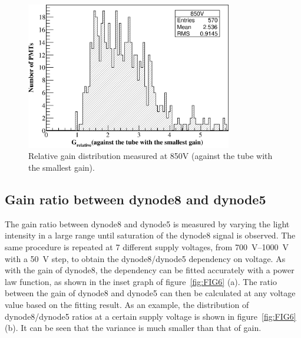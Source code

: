 \documentclass{JINST}
\begin{document}
\begin{figure}[tbp]
	\centering
	\includegraphics[width=90mm]{FIG5}
	\caption{Relative gain distribution measured at 850V (against the tube with the smallest gain).}
	\label{fig:FIG5}
\end{figure}
	
\subsection{Gain ratio between dynode8 and dynode5}
\label{sec:psd_dy58}
	
The gain ratio between dynode8 and dynode5 is measured by varying the light intensity in a large range until saturation of the dynode8 signal is observed.
The same procedure is repeated at 7 different supply voltages, from \SIrange{700}{1000}{\volt} with a \SI{50}{\volt} step, to obtain the dynode8/dynode5 dependency on voltage.
As with the gain of dynode8, the dependency can be fitted accurately with a power law function, as shown in the inset graph of figure~\ref{fig:FIG6} (a).
The ratio between the gain of dynode8 and dynode5 can then be calculated at any voltage value based on the fitting result.
As an example, the distribution of dynode8/dynode5 ratios at a certain supply voltage is shown in figure~\ref{fig:FIG6} (b).
It can be seen that the variance is much smaller than that of gain.

\end{document}
